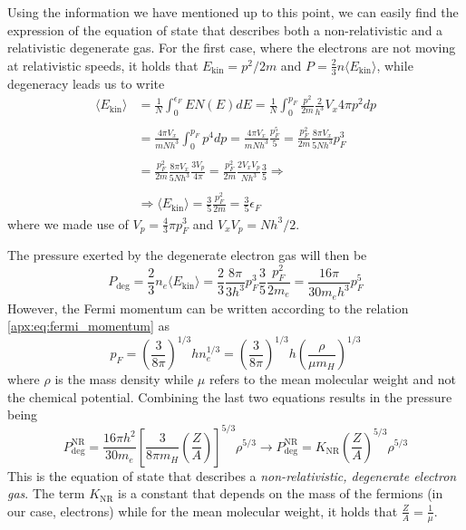 \documentclass[main.tex]{subfiles}
\begin{document}
Using the information we have mentioned up to this point, we can easily find the expression of the equation of state that describes both a non-relativistic and a relativistic degenerate gas. For the first case, where the electrons are not moving at relativistic speeds, it holds that $E_\text{kin} = p^2 / 2m$ and $P = \frac{2}{3}n \langle E_\text{kin} \rangle$, while degeneracy leads us to write
\begin{align*}
    \langle E_\text{kin} \rangle &= \frac{1}{N} \int_0^{\epsilon_F} E N(E) dE = \frac{1}{N} \int_0^{p_F} \frac{p^2}{2m} \frac{2}{h^3} V_x 4\pi p^2 dp \\\\
    &= \frac{4\pi V_x}{m N h^3} \int_0^{p_F} p^4 dp = \frac{4\pi V_x}{m N h^3} \frac{p_F^5}{5} = \frac{p_F^2}{2m} \frac{8\pi V_x}{5Nh^3} p_F^3 \\\\
    &= \frac{p_F^2}{2m} \frac{8\pi V_x}{5Nh^3} \frac{3 V_p}{4\pi} = \frac{p_F^2}{2m} \frac{2 V_x V_p}{Nh^3} \frac{3}{5} \Rightarrow \\\\
    &\Rightarrow \langle E_{\text{kin}} \rangle = \frac{3}{5} \frac{p_F^2}{2m} = \frac{3}{5} \epsilon_F
\end{align*}
where we made use of $V_p = \frac{4}{3} \pi p_F^3$ and $V_x V_p = N h^3/2$. 

The pressure exerted by the degenerate electron gas will then be
$$P_{\text{deg}} = \frac{2}{3} n_e \langle E_{\text{kin}} \rangle  = \frac{2}{3} \frac{8\pi}{3h^3} p_F^3 \frac{3}{5}\frac{p_F^2}{2m_e} = \frac{16\pi}{30m_e h^3}p_F^5$$
However, the Fermi momentum can be written according to the relation \eqref{apx:eq:fermi_momentum} as
$$p_F = \left( \frac{3}{8\pi} \right)^{1/3} h n_e^{1/3} = \left(\frac{3}{8\pi} \right)^{1/3} h \left(\frac{\rho}{\mu m_H} \right)^{1/3}$$
where $\rho$ is the mass density while $\mu$ refers to the mean molecular weight and not the chemical potential. Combining the last two equations results in the pressure being
\begin{equation}
    \label{apx:eq:degenerate_eos_nr}
    \boxed{P_{\text{deg}}^{\text{NR}} = \frac{16 \pi h^2}{30m_e} \left[ \frac{3}{8\pi m_H} \left(\frac{Z}{A} \right) \right]^{5/3} \rho^{5/3} \longrightarrow P_{\text{deg}}^{\text{NR}} = K_{\text{NR}} \left( \frac{Z}{A} \right)^{5/3} \rho^{5/3}}
\end{equation}
This is the equation of state that describes a \textit{non-relativistic, degenerate electron gas}. The term $K_{\text{NR}}$ is a constant that depends on the mass of the fermions (in our case, electrons) while for the mean molecular weight, it holds that $\frac{Z}{A} = \frac{1}{\mu}$.
\end{document}
